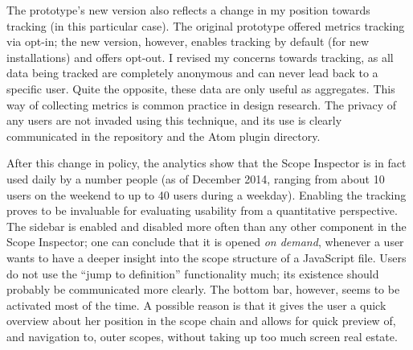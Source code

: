 The prototype’s new version also reflects a change in my position
towards tracking (in this particular case). The original prototype
offered metrics tracking via opt-in; the new version, however, enables
tracking by default (for new installations) and offers opt-out. I
revised my concerns towards tracking, as all data being tracked are
completely anonymous and can never lead back to a specific user. Quite
the opposite, these data are only useful as aggregates. This way of
collecting metrics is common practice in design research. The privacy of
any users are not invaded using this technique, and its use is clearly
communicated in the repository and the Atom plugin directory.

After this change in policy, the analytics show that the Scope Inspector
is in fact used daily by a number people (as of December 2014, ranging
from about 10 users on the weekend to up to 40 users during a weekday).
Enabling the tracking proves to be invaluable for evaluating usability
from a quantitative perspective. The sidebar is enabled and disabled
more often than any other component in the Scope Inspector; one can
conclude that it is opened \emph{on demand}, whenever a user wants to
have a deeper insight into the scope structure of a JavaScript file.
Users do not use the “jump to definition” functionality much; its
existence should probably be communicated more clearly. The bottom bar,
however, seems to be activated most of the time. A possible reason is
that it gives the user a quick overview about her position in the scope
chain and allows for quick preview of, and navigation to, outer scopes,
without taking up too much screen real estate.
